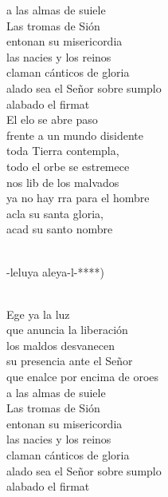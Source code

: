 \begin{cancion}
	a las almas de suiele\\
\jump
	Las tromas de Sión \\
entonan su misericordia\\
	las nacies y los reinos \\
claman cánticos de gloria\\
	alado sea el Señor sobre sumplo\\
	alabado el firmat\\
\jump
	El elo se abre paso \\
frente a un mundo disidente\\
	toda  Tierra contempla, \\
todo el orbe se estremece\\
	nos lib de los malvados  \\
	ya no hay rra para el hombre\\
	acla su santa gloria,\\
	 acad su santo nombre\\\jump\\
	\begin{chorus}%
	-leluya aleya-l-*)\\
	\end{chorus}%
	\jump\\
	Ege ya la luz \\
que anuncia la liberación\\
	los maldos desvanecen \\
su presencia ante el Señor\\
	que enalce por encima de oroes\\
	a las almas de suiele\\
\jump
	Las tromas de Sión \\
entonan su misericordia\\
	las nacies y los reinos \\
claman cánticos de gloria\\
	alado sea el Señor sobre sumplo\\
	alabado el firmat\\

\end{cancion}
